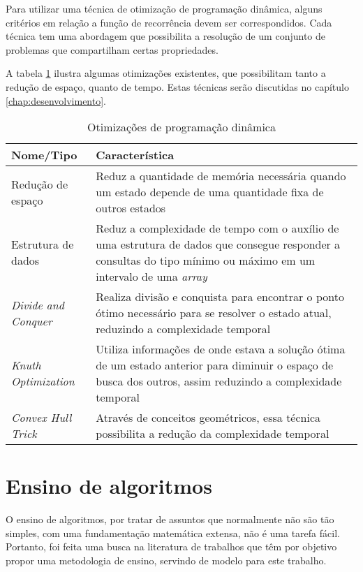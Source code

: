 Para utilizar uma técnica de otimização de programação dinâmica, alguns critérios em relação a função de recorrência devem ser correspondidos. Cada técnica tem uma abordagem que possibilita a resolução de um conjunto de problemas que compartilham certas propriedades.

A tabela \ref{tab:otimizacoes} ilustra algumas otimizações existentes, que possibilitam tanto a redução de espaço, quanto de tempo. Estas técnicas serão discutidas no capítulo \ref{chap:desenvolvimento}.

\begin{table}[H]
	\centering
	\caption[Otimizações de programação dinâmica]{Otimizações de programação dinâmica}
	\label{tab:otimizacoes}
	\begin{tabular}{p{4cm}  p{11cm}}
		\hline \SPACE
		\textbf{Nome/Tipo} & \textbf{Característica} \\ \hline \SPACE
		Redução de espaço &  Reduz a quantidade de memória necessária quando um estado depende de uma quantidade fixa de outros estados \\ \hline \SPACE
		Estrutura de dados &  Reduz a complexidade de tempo com o auxílio de uma estrutura de dados que consegue responder a consultas do tipo mínimo ou máximo em um intervalo de uma \textit{array}  \\ \hline \SPACE
		\textit{Divide and Conquer} & Realiza divisão e conquista para encontrar o ponto ótimo necessário para se resolver o estado atual, reduzindo a complexidade temporal \\ \hline \SPACE
		\textit{Knuth Optimization} & Utiliza informações de onde estava a solução ótima de um estado anterior para diminuir o espaço de busca dos outros, assim reduzindo a complexidade temporal  \\ \hline \SPACE
		\textit{Convex Hull Trick} & Através de conceitos geométricos, essa técnica possibilita a redução da complexidade temporal \\ \hline 
	\end{tabular}
	
\end{table}

\section{Ensino de algoritmos}
\label{sec:ensino}

O ensino de algoritmos, por tratar de assuntos que normalmente não são tão simples, com uma fundamentação matemática extensa, não é uma tarefa fácil. Portanto, foi feita uma busca na literatura de trabalhos que têm por objetivo propor uma metodologia de ensino, servindo de modelo para este trabalho.


